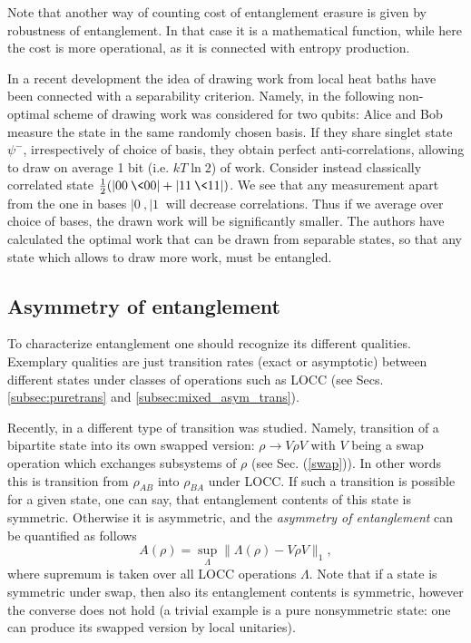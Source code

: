 \documentclass[rmp,12pt,preprint]{revtex4-2}
\begin{document}
Note that another way of counting cost of entanglement erasure is
given by robustness of entanglement. In that case it is a mathematical
function, while here the cost is more operational, as it is connected
with entropy production.

In a recent development the idea of drawing work from local heat baths
have been connected with a separability criterion. Namely, in
\cite{MaruyamaMV2003-thermo-ent} the following non-optimal scheme of
drawing work was considered for two qubits: Alice and Bob measure the
state in the same randomly chosen basis. If they share singlet state
$\psi^-$, irrespectively of choice of basis, they obtain perfect
anti-correlations, allowing to draw on average 1 bit (i.e.  $kT \ln2$)
of work. Consider instead classically correlated state
$\frac{1}{2}(|00\>\<00|+|11\>\<11|)$. We see that any measurement apart from
the one in bases $|0\>,|1\>$ will decrease correlations. Thus if we
average over choice of bases, the drawn work will be significantly
smaller. The authors have calculated the optimal work that can be
drawn from separable states, so that any state which allows to draw
more work, must be entangled.



\subsection{Asymmetry of entanglement}
\label{sec:asym}

To characterize entanglement one should recognize its different
qualities. Exemplary qualities are just transition rates (exact or asymptotic) between different states under classes of operations such as LOCC  (see Secs. \ref{subsec:puretrans} and \ref{subsec:mixed_asym_trans}).

Recently, in \cite{HHHH-asymmetry} a different type of transition was
studied. Namely, transition of a bipartite state into its own swapped
version: $\rho \longrightarrow V\rho V$ with $V$ being a swap operation
which exchanges subsystems of $\rho$ (see Sec. (\ref{swap})). In other
words this is transition from $\rho_{AB}$ into
$\rho_{BA}$ under LOCC. If such a transition is possible for a given state, one
can say, that entanglement contents of this state is symmetric.
Otherwise it is asymmetric, and the {\it asymmetry of entanglement} can be quantified as follows
\begin{equation}
A(\rho)=\sup_\Lambda \|\Lambda(\rho) - V\rho V \|_1,
\end{equation}
where supremum is taken over all LOCC operations $\Lambda$.
Note that if a state is symmetric under swap, then also its entanglement
contents is symmetric, however the converse does not hold (a trivial example
is a pure nonsymmetric state: one can produce its swapped version by
local unitaries).
\end{document}
